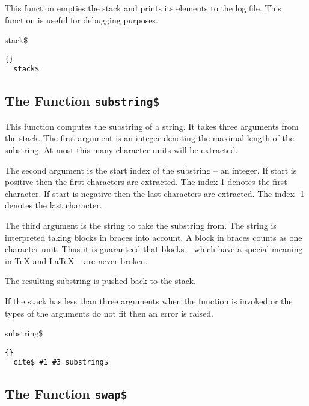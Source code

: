 This function empties the stack and prints its elements to the log
file. This function is useful for debugging purposes.

\begin{BstFunction}{stack\$}
\end{BstFunction}

\begin{lstlisting}{}
  stack$
\end{lstlisting}


\subsection{The Function \texttt{substring\$}}%

This function computes the substring of a string. It takes three
arguments from the stack. The first argument is an integer denoting
the maximal length of the substring. At most this many character units
will be extracted.

The second argument is the start index of the substring -- an integer.
If start is positive then the first characters are extracted.  The
index 1 denotes the first character. If start is negative then the
last characters are extracted.  The index -1 denotes the last
character.

The third argument is the string to take the substring from. The
string is interpreted taking blocks in braces into account. A block in
braces counts as one character unit. Thus it is guaranteed that blocks
-- which have a special meaning in \TeX{} and
\LaTeX{} -- are never broken.

The resulting substring is pushed back to the stack.

If the stack has less than three arguments when the function is
invoked or the types of the arguments do not fit then an error is
raised.

\begin{BstFunction}{substring\$}
\end{BstFunction}

\begin{lstlisting}{}
  cite$ #1 #3 substring$
\end{lstlisting}

\subsection{The Function \texttt{swap\$}}%

